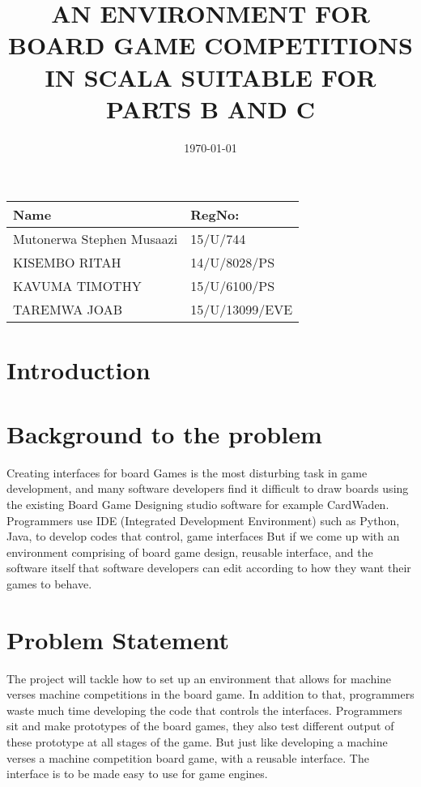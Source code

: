 \documentclass[a4paper,12pt]{article}
\begin{document}
\title{AN ENVIRONMENT FOR BOARD GAME COMPETITIONS IN SCALA SUITABLE FOR PARTS B AND C}
\date{\today}

\begin{tabular}{|l|l|}
\hline
Name & RegNo: \\
\hline
Mutonerwa Stephen Musaazi & 15/U/744 \\
\hline
 KISEMBO RITAH & 14/U/8028/PS \\
\hline
 KAVUMA TIMOTHY	& 15/U/6100/PS \\ 
\hline
 TAREMWA JOAB	& 15/U/13099/EVE \\
\hline
\end{tabular}


\maketitle
{}

\newpage
\section{Introduction}
\section{  Background to the problem}

Creating interfaces for board Games is the most disturbing task in game development, and many software developers find it difficult to draw boards using the existing Board Game Designing  studio software for example CardWaden. 
Programmers use IDE (Integrated Development Environment) such as Python, Java, to develop codes that control, game interfaces
But if we come up with an environment comprising of board game design, reusable interface, and the software itself that software developers can edit according to how they want their games to behave.

\section{ Problem Statement}
The project will tackle how to set up an environment that allows for machine verses machine competitions in the board game.  
In addition to that, programmers waste much time developing the code that controls the interfaces. Programmers sit and make prototypes of the board games, they also test different output of these prototype at all stages of the game.
But just like developing a machine verses a machine competition board game, with a reusable interface.  The interface is to be made easy to use for game engines.
\end{document}
